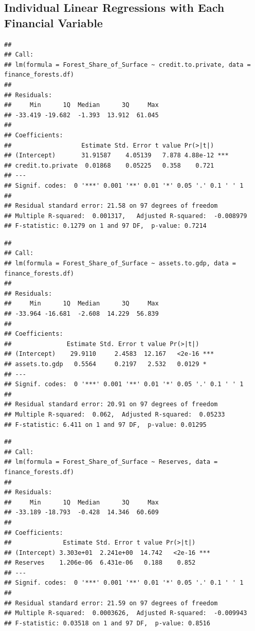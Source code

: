 \documentclass[
  12pt,
]{article}
\begin{document}
\hypertarget{individual-linear-regressions-with-each-financial-variable}{%
\subsection{Individual Linear Regressions with Each Financial
Variable}\label{individual-linear-regressions-with-each-financial-variable}}

\begin{verbatim}
## 
## Call:
## lm(formula = Forest_Share_of_Surface ~ credit.to.private, data = finance_forests.df)
## 
## Residuals:
##     Min      1Q  Median      3Q     Max 
## -33.419 -19.682  -1.393  13.912  61.045 
## 
## Coefficients:
##                   Estimate Std. Error t value Pr(>|t|)    
## (Intercept)       31.91587    4.05139   7.878 4.88e-12 ***
## credit.to.private  0.01868    0.05225   0.358    0.721    
## ---
## Signif. codes:  0 '***' 0.001 '**' 0.01 '*' 0.05 '.' 0.1 ' ' 1
## 
## Residual standard error: 21.58 on 97 degrees of freedom
## Multiple R-squared:  0.001317,   Adjusted R-squared:  -0.008979 
## F-statistic: 0.1279 on 1 and 97 DF,  p-value: 0.7214
\end{verbatim}

\begin{verbatim}
## 
## Call:
## lm(formula = Forest_Share_of_Surface ~ assets.to.gdp, data = finance_forests.df)
## 
## Residuals:
##     Min      1Q  Median      3Q     Max 
## -33.964 -16.681  -2.608  14.229  56.839 
## 
## Coefficients:
##               Estimate Std. Error t value Pr(>|t|)    
## (Intercept)    29.9110     2.4583  12.167   <2e-16 ***
## assets.to.gdp   0.5564     0.2197   2.532   0.0129 *  
## ---
## Signif. codes:  0 '***' 0.001 '**' 0.01 '*' 0.05 '.' 0.1 ' ' 1
## 
## Residual standard error: 20.91 on 97 degrees of freedom
## Multiple R-squared:  0.062,  Adjusted R-squared:  0.05233 
## F-statistic: 6.411 on 1 and 97 DF,  p-value: 0.01295
\end{verbatim}

\begin{verbatim}
## 
## Call:
## lm(formula = Forest_Share_of_Surface ~ Reserves, data = finance_forests.df)
## 
## Residuals:
##     Min      1Q  Median      3Q     Max 
## -33.189 -18.793  -0.428  14.346  60.609 
## 
## Coefficients:
##              Estimate Std. Error t value Pr(>|t|)    
## (Intercept) 3.303e+01  2.241e+00  14.742   <2e-16 ***
## Reserves    1.206e-06  6.431e-06   0.188    0.852    
## ---
## Signif. codes:  0 '***' 0.001 '**' 0.01 '*' 0.05 '.' 0.1 ' ' 1
## 
## Residual standard error: 21.59 on 97 degrees of freedom
## Multiple R-squared:  0.0003626,  Adjusted R-squared:  -0.009943 
## F-statistic: 0.03518 on 1 and 97 DF,  p-value: 0.8516
\end{verbatim}
\end{document}
